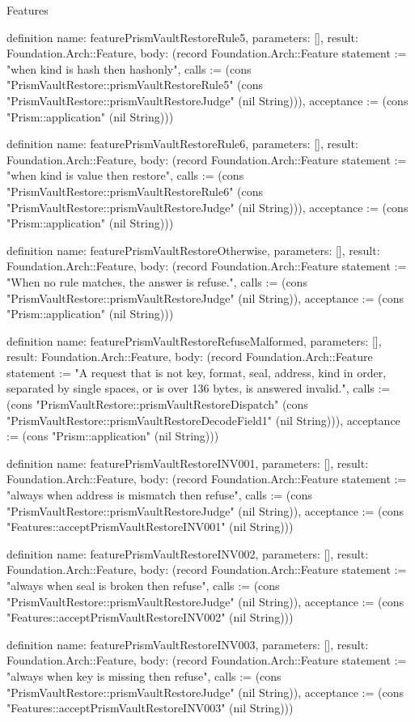\begin{lexlean}{Features}
\begin{semanticmodule}
definition{
  name: featurePrismVaultRestoreRule5,
  parameters: [],
  result: Foundation.Arch::Feature,
  body: (record Foundation.Arch::Feature {statement := "when kind is hash then hashonly", calls := (cons "PrismVaultRestore::prismVaultRestoreRule5" (cons "PrismVaultRestore::prismVaultRestoreJudge" (nil String))), acceptance := (cons "Prism::application" (nil String))})
}

definition{
  name: featurePrismVaultRestoreRule6,
  parameters: [],
  result: Foundation.Arch::Feature,
  body: (record Foundation.Arch::Feature {statement := "when kind is value then restore", calls := (cons "PrismVaultRestore::prismVaultRestoreRule6" (cons "PrismVaultRestore::prismVaultRestoreJudge" (nil String))), acceptance := (cons "Prism::application" (nil String))})
}

definition{
  name: featurePrismVaultRestoreOtherwise,
  parameters: [],
  result: Foundation.Arch::Feature,
  body: (record Foundation.Arch::Feature {statement := "When no rule matches, the answer is refuse.", calls := (cons "PrismVaultRestore::prismVaultRestoreJudge" (nil String)), acceptance := (cons "Prism::application" (nil String))})
}

definition{
  name: featurePrismVaultRestoreRefuseMalformed,
  parameters: [],
  result: Foundation.Arch::Feature,
  body: (record Foundation.Arch::Feature {statement := "A request that is not key, format, seal, address, kind in order, separated by single spaces, or is over 136 bytes, is answered invalid.", calls := (cons "PrismVaultRestore::prismVaultRestoreDispatch" (cons "PrismVaultRestore::prismVaultRestoreDecodeField1" (nil String))), acceptance := (cons "Prism::application" (nil String))})
}

definition{
  name: featurePrismVaultRestoreINV001,
  parameters: [],
  result: Foundation.Arch::Feature,
  body: (record Foundation.Arch::Feature {statement := "always when address is mismatch then refuse", calls := (cons "PrismVaultRestore::prismVaultRestoreJudge" (nil String)), acceptance := (cons "Features::acceptPrismVaultRestoreINV001" (nil String))})
}

definition{
  name: featurePrismVaultRestoreINV002,
  parameters: [],
  result: Foundation.Arch::Feature,
  body: (record Foundation.Arch::Feature {statement := "always when seal is broken then refuse", calls := (cons "PrismVaultRestore::prismVaultRestoreJudge" (nil String)), acceptance := (cons "Features::acceptPrismVaultRestoreINV002" (nil String))})
}

definition{
  name: featurePrismVaultRestoreINV003,
  parameters: [],
  result: Foundation.Arch::Feature,
  body: (record Foundation.Arch::Feature {statement := "always when key is missing then refuse", calls := (cons "PrismVaultRestore::prismVaultRestoreJudge" (nil String)), acceptance := (cons "Features::acceptPrismVaultRestoreINV003" (nil String))})
}


\end{semanticmodule}
\end{lexlean}
